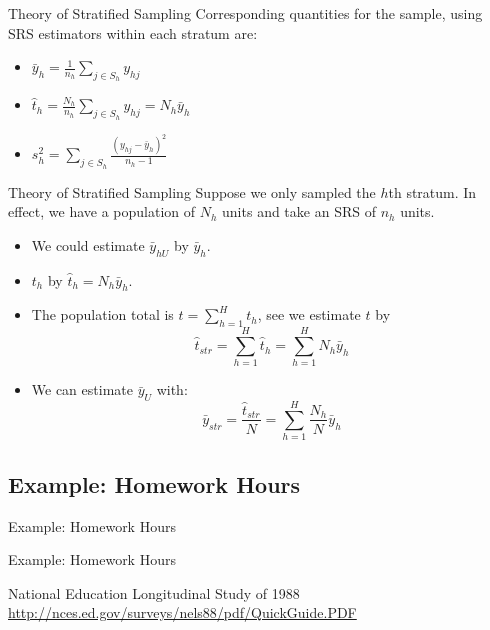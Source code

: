 \documentclass[10pt]{beamer}\usepackage[]{graphicx}\usepackage[]{xcolor}
\begin{document}
\begin{frame}{Theory of Stratified Sampling}
Corresponding quantities for the sample, using SRS estimators within each stratum are:

\begin{itemize}
\item $\bar{y}_h = \frac{1}{n_h} \sum_{j \in S_h} y_{hj}$
\item $\hat{t}_h = \frac{N_h}{n_h} \sum_{j\in S_h} y_{hj} = N_h \bar{y}_{h}$
\item $s_h^2 = \sum_{j\in S_h} \frac{(y_{hj}-\bar{y}_h)^2}{n_h-1}$ 
\end{itemize}

\end{frame}

\begin{frame}{Theory of Stratified Sampling}
Suppose we only sampled the $h$th stratum. In effect, we have a population of $N_h$ units and take an SRS of $n_h$ units. 

\begin{itemize}
\item We could estimate $\bar{y}_{hU}$ by $\bar{y}_{h}$.
\item $t_h$ by $\hat{t}_h=N_h \bar{y}_h$. 
\item The population total is $t=\sum_{h=1}^H t_h$, see we estimate $t$ by
$$ \hat{t}_{str} = \sum_{h=1}^H \hat{t}_h = \sum_{h=1}^H N_h \bar{y}_h$$
\item We can estimate $\bar{y}_U$ with:
$$\bar{y}_{str} = \frac{\hat{t}_{str}}{N} =\sum_{h=1}^H \frac{N_h}{N} \bar{y}_h$$
\end{itemize}

\end{frame}

\subsection{Example: Homework Hours}
\begin{frame}{}
\begin{block}{}
Example: Homework Hours
\end{block}
\end{frame}

\begin{frame}{Example: Homework Hours}
\begin{block}{National Education Longitudinal Study of 1988}
\url{http://nces.ed.gov/surveys/nels88/pdf/QuickGuide.PDF}
\end{block}
\end{frame}
\end{document}
